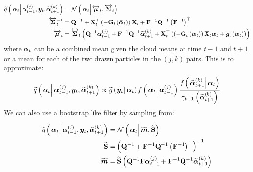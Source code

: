\begin{equation}\label{eqn:TaylorProposalForward}\begin{split}
	\IDAproxC{\vec{\alpha}_t}{\partic{\vec{\alpha}}{t-1}{j},\vec{y}_t, \particB{\vec{\alpha}}{t+1}{k}}  &=   %
		\normalC{\vec{\alpha}_t}{\vecLRarrow{\mu}_t}{\matLRarrow{\Sigma}_t} \\
%
	\matLRarrow{\Sigma}_t^{-1} &= 
		\mat{Q}^{-1} + 
		\mat{X}_t^\top\Lparen{-\mat{G}_t\Lparen{\vecb{\alpha}_{t}}}
		\mat{X}_t + \mat{F}^{-1}\mat{Q}^{-1}\Lparen{\mat{F}^{-1}}^\top  \\
%
	\vecLRarrow{\mu}_t 
	 &=  \matLRarrow{\Sigma}_t \Lparen{
		\mat{Q}^{-1}\partic{\vec{\alpha}}{t-1}{j} + 
		\mat{F}^{-1}\mat{Q}^{-1}\particB{\vec{\alpha}}{t + 1}{k} + 
		\mat{X}_t^\top
		\Lparen{
			\Lparen{-\mat{G}_t\Lparen{\vecb{\alpha}_{t}}}
			\mat{X}_t\vecb{\alpha}_{t} +
			\vec{g}_t\Lparen{\vecb{\alpha}_{t}}
		}}
\end{split}\end{equation}%
%
where $\bar{\bm{\alpha}}_{t}$ can be a combined mean given the cloud means at time $t - 1$ and $t + 1$ or a mean for each of the  two drawn particles in the $(j,k)$ pairs. This is to approximate:
%
%
\begin{equation}\begin{split}
	\IDAproxC{\vec{\alpha}_t}{\partic{\vec{\alpha}}{t-1}{j},\vec{y}_t, \particB{\vec{\alpha}}{t+1}{k}} \propto %
%
	\optorC{\widetilde{g}}{\vec{y}_t}{\vec{\alpha}_t}
		\optorC{f}{\vec{\alpha}_t}{\partic{\vec{\alpha}}{t-1}{j}}
		\frac{
			\optorC{f}{\particB{\vec{\alpha}}{t+1}{k}}{\vec{\alpha}_t}
		}{
			\gamma_{t + 1}\Lparen{\particB{\vec{\alpha}}{t+1}{k}}
		}
\end{split}\end{equation}
%
We can also use a bootstrap like filter by sampling from:

\begin{equation}\begin{split}
	\IDAproxC{\vec{\alpha}_t}{\partic{\vec{\alpha}}{t-1}{j},\vec{y}_t, \particB{\vec{\alpha}}{t+1}{k}} &=
		\normalC{\vec{\alpha}_t}{\vect{m}}{\matt{S}} \\
%
	\matt{S} &= \Lparen{\mat{Q}^{-1} + \mat{F}^{-1}\mat{Q}^{-1}\Lparen{\mat{F}^{-1}}^\top}^{-1} \\
% 
	\vect{m} &= \matt{S}\Lparen{
			 \mat{Q}^{-1}\mat{F}\partic{\vec{\alpha}}{t-1}{j} +
			 \mat{F}^{-1}\mat{Q}^{-1}\particB{\vec{\alpha}}{t + 1}{k}}
\end{split}\end{equation}

